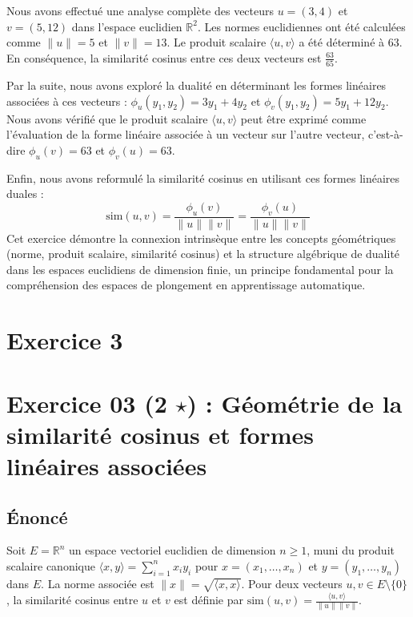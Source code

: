 \documentclass[11pt,a4paper]{report}
\begin{document}
Nous avons effectué une analyse complète des vecteurs \(u = (3, 4)\) et
\(v = (5, 12)\) dans l'espace euclidien \(\mathbb{R}^2\). Les normes
euclidiennes ont été calculées comme \(\|u\| = 5\) et \(\|v\| = 13\). Le
produit scalaire \(\langle u, v \rangle\) a été déterminé à \(63\). En
conséquence, la similarité cosinus entre ces deux vecteurs est
\(\frac{63}{65}\).

Par la suite, nous avons exploré la dualité en déterminant les formes
linéaires associées à ces vecteurs : \(\phi_u(y_1, y_2) = 3y_1 + 4y_2\)
et \(\phi_v(y_1, y_2) = 5y_1 + 12y_2\). Nous avons vérifié que le
produit scalaire \(\langle u, v \rangle\) peut être exprimé comme
l'évaluation de la forme linéaire associée à un vecteur sur l'autre
vecteur, c'est-à-dire \(\phi_u(v) = 63\) et \(\phi_v(u) = 63\).

Enfin, nous avons reformulé la similarité cosinus en utilisant ces
formes linéaires duales :
\[ \text{sim}(u, v) = \frac{\phi_u(v)}{\|u\| \|v\|} = \frac{\phi_v(u)}{\|u\| \|v\|} \]
Cet exercice démontre la connexion intrinsèque entre les concepts
géométriques (norme, produit scalaire, similarité cosinus) et la
structure algébrique de dualité dans les espaces euclidiens de dimension
finie, un principe fondamental pour la compréhension des espaces de
plongement en apprentissage automatique.


\section*{Exercice 3}
\hypertarget{exercice-03-2-star-guxe9omuxe9trie-de-la-similarituxe9-cosinus-et-formes-linuxe9aires-associuxe9es}{%
\section{\texorpdfstring{Exercice 03 (2 \(\star\)) : Géométrie de la
similarité cosinus et formes linéaires
associées}{Exercice 03 (2 \textbackslash star) : Géométrie de la similarité cosinus et formes linéaires associées}}\label{exercice-03-2-star-guxe9omuxe9trie-de-la-similarituxe9-cosinus-et-formes-linuxe9aires-associuxe9es}}

\hypertarget{uxe9noncuxe9}{%
\subsection{Énoncé}\label{uxe9noncuxe9}}

Soit \(E = \mathbb{R}^n\) un espace vectoriel euclidien de dimension
\(n \ge 1\), muni du produit scalaire canonique
\(\langle x, y \rangle = \sum_{i=1}^n x_i y_i\) pour
\(x=(x_1, \dots, x_n)\) et \(y=(y_1, \dots, y_n)\) dans \(E\). La norme
associée est \(\|x\| = \sqrt{\langle x, x \rangle}\). Pour deux vecteurs
\(u, v \in E \setminus \{0\}\), la similarité cosinus entre \(u\) et
\(v\) est définie par
\(\text{sim}(u, v) = \frac{\langle u, v \rangle}{\|u\| \|v\|}\).
\end{document}
